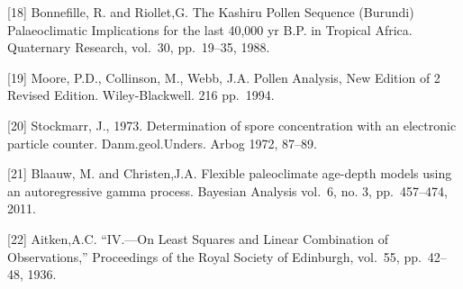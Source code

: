 \documentclass[
]{article}
\begin{document}
{[}18{]} Bonnefille, R. and Riollet,G. The Kashiru Pollen Sequence
(Burundi) Palaeoclimatic Implications for the last 40,000 yr B.P. in
Tropical Africa. Quaternary Research, vol.~30, pp.~19--35, 1988.

{[}19{]} Moore, P.D., Collinson, M., Webb, J.A. Pollen Analysis, New
Edition of 2 Revised Edition. Wiley-Blackwell. 216 pp.~1994.

{[}20{]} Stockmarr, J., 1973. Determination of spore concentration with
an electronic particle counter. Danm.geol.Unders. Arbog 1972, 87--89.

{[}21{]} Blaauw, M. and Christen,J.A. Flexible paleoclimate age-depth
models using an autoregressive gamma process. Bayesian Analysis vol.~6,
no. 3, pp.~457--474, 2011.

{[}22{]} Aitken,A.C. ``IV.---On Least Squares and Linear Combination of
Observations,'' Proceedings of the Royal Society of Edinburgh, vol.~55,
pp.~42--48, 1936.
\end{document}
